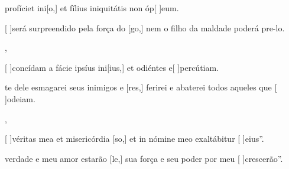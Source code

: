 {  {\item {} profíciet ini[o,] et fílius iniquitátis non óp[ ]{e}um.~\Antiphona}%
    {\item {}[ ]{se}rá surpreendido pela força do [go,] nem o filho da maldade poderá pre-lo.~\Antiphona},
  {\item {}[ ]{con}cídam a fácie ipsíus ini[ius,] et odiéntes e[ ]{per}{cú}tiam.~\Antiphona}%
    {\item {}te dele esmagarei seus inimigos e [res,] ferirei e abaterei todos aqueles que [ ]{o}{dei}am.~\Antiphona},
  {\item {}[ ]{vé}ritas mea et misericórdia [so,] et in nómine meo exaltábitur [ ]{e}ius''.~\Antiphona}%
    {\item {} verdade e meu amor estarão [le,] sua força e seu poder por meu [ ]{cres}cerão''.~\Antiphona}
}